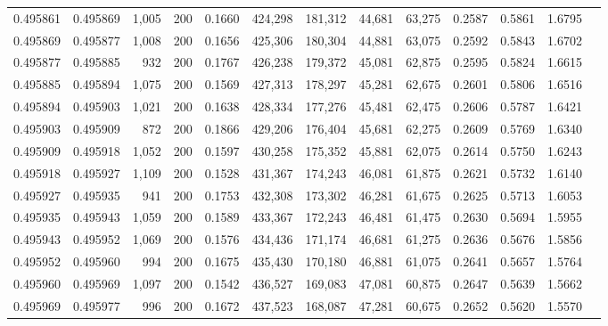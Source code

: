 \begin{tabular}{rrrrrrrrrrrrr}
0.495861 & 0.495869 & 1,005 & 200 &                                     0.1660 & 424,298 & 181,312 &  44,681 &  63,275 & 0.2587 & 0.5861 & 1.6795 \\
0.495869 & 0.495877 & 1,008 & 200 &                                     0.1656 & 425,306 & 180,304 &  44,881 &  63,075 & 0.2592 & 0.5843 & 1.6702 \\
0.495877 & 0.495885 &   932 & 200 &                                     0.1767 & 426,238 & 179,372 &  45,081 &  62,875 & 0.2595 & 0.5824 & 1.6615 \\
0.495885 & 0.495894 & 1,075 & 200 &                                     0.1569 & 427,313 & 178,297 &  45,281 &  62,675 & 0.2601 & 0.5806 & 1.6516 \\
0.495894 & 0.495903 & 1,021 & 200 &                                     0.1638 & 428,334 & 177,276 &  45,481 &  62,475 & 0.2606 & 0.5787 & 1.6421 \\
0.495903 & 0.495909 &   872 & 200 &                                     0.1866 & 429,206 & 176,404 &  45,681 &  62,275 & 0.2609 & 0.5769 & 1.6340 \\
0.495909 & 0.495918 & 1,052 & 200 &                                     0.1597 & 430,258 & 175,352 &  45,881 &  62,075 & 0.2614 & 0.5750 & 1.6243 \\
0.495918 & 0.495927 & 1,109 & 200 &                                     0.1528 & 431,367 & 174,243 &  46,081 &  61,875 & 0.2621 & 0.5732 & 1.6140 \\
0.495927 & 0.495935 &   941 & 200 &                                     0.1753 & 432,308 & 173,302 &  46,281 &  61,675 & 0.2625 & 0.5713 & 1.6053 \\
0.495935 & 0.495943 & 1,059 & 200 &                                     0.1589 & 433,367 & 172,243 &  46,481 &  61,475 & 0.2630 & 0.5694 & 1.5955 \\
0.495943 & 0.495952 & 1,069 & 200 &                                     0.1576 & 434,436 & 171,174 &  46,681 &  61,275 & 0.2636 & 0.5676 & 1.5856 \\
0.495952 & 0.495960 &   994 & 200 &                                     0.1675 & 435,430 & 170,180 &  46,881 &  61,075 & 0.2641 & 0.5657 & 1.5764 \\
0.495960 & 0.495969 & 1,097 & 200 &                                     0.1542 & 436,527 & 169,083 &  47,081 &  60,875 & 0.2647 & 0.5639 & 1.5662 \\
0.495969 & 0.495977 &   996 & 200 &                                     0.1672 & 437,523 & 168,087 &  47,281 &  60,675 & 0.2652 & 0.5620 & 1.5570 \\

\end{tabular}
